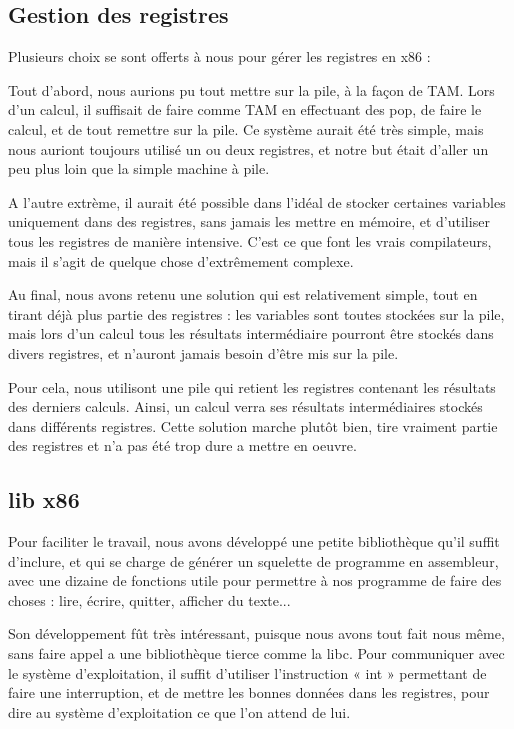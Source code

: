\documentclass{scrartcl}
\begin{document}
\subsection{Gestion des registres}

Plusieurs choix se sont offerts à nous pour gérer les registres en x86 :

Tout d'abord, nous aurions pu tout mettre sur la pile, à la façon de TAM. Lors d'un calcul,
il suffisait de faire comme TAM en effectuant des pop, de faire le calcul, et de tout remettre
sur la pile. Ce système aurait été très simple, mais nous auriont toujours utilisé un ou deux
registres, et notre but était d'aller un peu plus loin que la simple machine à pile.

A l'autre extrème, il aurait été possible dans l'idéal de stocker certaines variables
uniquement dans des registres, sans jamais les mettre en mémoire, et d'utiliser tous les
registres de manière intensive. C'est ce que font les vrais compilateurs, mais il s'agit
de quelque chose d'extrêmement complexe.

Au final, nous avons retenu une solution qui est relativement simple, tout en tirant déjà plus
partie des registres : les variables sont toutes stockées sur la pile, mais lors d'un calcul
tous les résultats intermédiaire pourront être stockés dans divers registres, et n'auront jamais
besoin d'être mis sur la pile.

Pour cela, nous utilisont une pile qui retient les registres contenant les résultats
des derniers calculs. Ainsi, un calcul verra ses résultats intermédiaires stockés dans différents
registres. Cette solution marche plutôt bien, tire vraiment partie des registres et n'a pas été
trop dure a mettre en oeuvre.

\subsection{lib x86}

Pour faciliter le travail, nous avons développé une petite bibliothèque qu'il suffit d'inclure,
et qui se charge de générer un squelette de programme en assembleur, avec une dizaine de 
fonctions utile pour permettre à nos programme de faire des choses : lire, écrire, quitter,
afficher du texte...

Son développement fût très intéressant, puisque nous avons tout fait nous même, sans faire
appel a une bibliothèque tierce comme la libc.
Pour communiquer avec le système d'exploitation, il suffit d'utiliser l'instruction « int »
permettant de faire une interruption, et de mettre les bonnes données dans les registres,
pour dire au système d'exploitation ce que l'on attend de lui.
\end{document}
